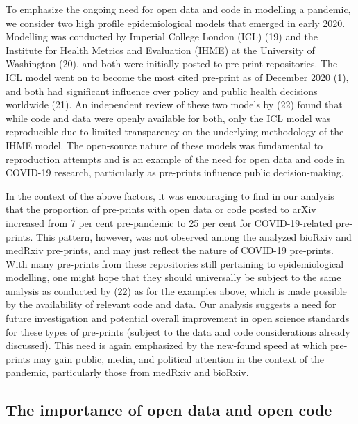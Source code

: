 \documentclass[
]{article}
\begin{document}
To emphasize the ongoing need for open data and code in modelling a pandemic, we consider two high profile epidemiological models that emerged in early 2020. Modelling was conducted by Imperial College London (ICL) (19) and the Institute for Health Metrics and Evaluation (IHME) at the University of Washington (20), and both were initially posted to pre-print repositories. The ICL model went on to become the most cited pre-print as of December 2020 (1), and both had significant influence over policy and public health decisions worldwide (21). An independent review of these two models by (22) found that while code and data were openly available for both, only the ICL model was reproducible due to limited transparency on the underlying methodology of the IHME model. The open-source nature of these models was fundamental to reproduction attempts and is an example of the need for open data and code in COVID-19 research, particularly as pre-prints influence public decision-making.

In the context of the above factors, it was encouraging to find in our analysis that the proportion of pre-prints with open data or code posted to arXiv increased from 7 per cent pre-pandemic to 25 per cent for COVID-19-related pre-prints. This pattern, however, was not observed among the analyzed bioRxiv and medRxiv pre-prints, and may just reflect the nature of COVID-19 pre-prints. With many pre-prints from these repositories still pertaining to epidemiological modelling, one might hope that they should universally be subject to the same analysis as conducted by (22) as for the examples above, which is made possible by the availability of relevant code and data. Our analysis suggests a need for future investigation and potential overall improvement in open science standards for these types of pre-prints (subject to the data and code considerations already discussed). This need is again emphasized by the new-found speed at which pre-prints may gain public, media, and political attention in the context of the pandemic, particularly those from medRxiv and bioRxiv.

\hypertarget{the-importance-of-open-data-and-open-code}{%
\subsection{The importance of open data and open code}\label{the-importance-of-open-data-and-open-code}}
\end{document}
